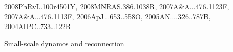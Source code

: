 \documentclass[12pt]{article}
\begin{document}
\begin{description}
{2008PhRvL.100r4501Y,%
2008MNRAS.386.1038B,%
2007A&A...476.1123F,%
2007A&A...476.1113F,%
2006ApJ...653..558O,%
2005AN....326..787B,%
2004AIPC..733..122B%
}

\item
Small-scale dynamos and reconnection \citep{
2013MNRAS.429.2469B,%
2013MNRAS.428.3569C,%
2011ApJ...741...92B,%
2010AN....331...46B,%
2009PhRvE..80e5301B,%
2007NJPh....9..300S,%
2005ApJ...625L.115S,%
2004PhRvE..70c6408H,%
2004MNRAS.353..947H,%
2004PhRvE..70a6308H,%
2003ApJ...597L.141H,%
2003PhRvE..68b6304D%
}


\end{description}
\end{document}
